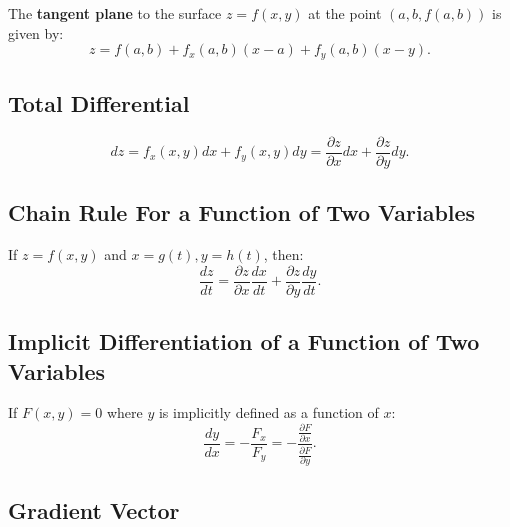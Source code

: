 \documentclass[a4paper,11pt]{article}
\begin{document}
\begin{tcolorbox}
    The \textbf{tangent plane} to the surface $z=f(x,y)$ at the point $(a, b, f(a,b))$ is given by:
    \[
    z = f(a,b) + f_x(a,b)(x-a) + f_y(a,b)(x-y).
    \]
\end{tcolorbox}




\subsection{Total Differential}

\begin{tcolorbox}
    \[
    dz = f_x(x,y)dx + f_y(x,y)dy = \frac{\partial z}{\partial x} dx + \frac{\partial z}{\partial y} dy.
    \]
\end{tcolorbox}




\subsection{Chain Rule For a Function of Two Variables}

\begin{tcolorbox}
    If $z=f(x,y)$ and $x=g(t),y=h(t)$, then:
    \[
    \frac{dz}{dt} = \frac{\partial z}{\partial x} \frac{dx}{dt} + \frac{\partial z}{\partial y} \frac{dy}{dt}.
    \]
\end{tcolorbox}




\subsection{Implicit Differentiation of a Function of Two Variables}

\begin{tcolorbox}
    If $F(x,y)=0$ where $y$ is implicitly defined as a function of $x$:
    \[
    \frac{dy}{dx} = -\frac{F_x}{F_y} = -\frac{\frac{\partial F}{\partial x}}{\frac{\partial F}{\partial y}}.
    \]    
\end{tcolorbox}




\subsection{Gradient Vector}
\end{document}
